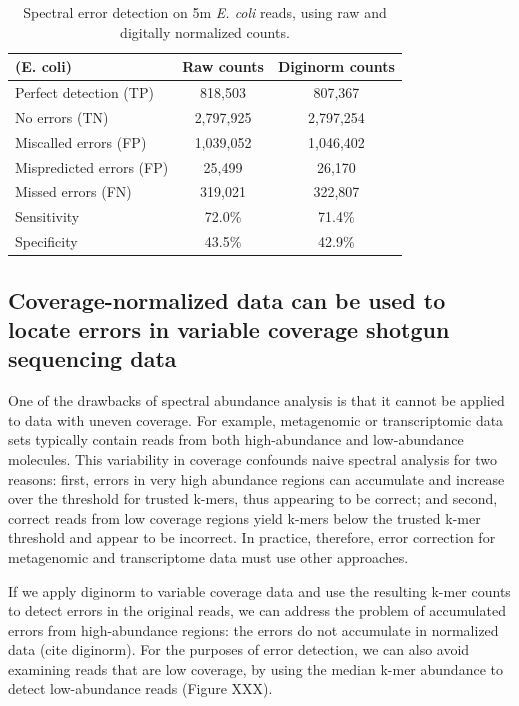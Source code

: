 \documentclass{article}
\begin{document}
\begin{table}
\begin{tabular}{|l|c|c|}
\hline
(E. coli) & Raw counts & Diginorm counts \\
\hline
Perfect detection (TP) & 818,503 & 807,367 \\
No errors (TN) & 2,797,925 & 2,797,254 \\
Miscalled errors (FP) & 1,039,052 & 1,046,402 \\
Mispredicted errors (FP) & 25,499 & 26,170 \\
Missed errors (FN) & 319,021 & 322,807 \\
\hline
Sensitivity & 72.0\% & 71.4\% \\
Specificity & 43.5\% & 42.9\% \\
\hline
\end{tabular}
\label{tab:ecoli_dn_counts}

\caption{Spectral error detection on 5m {\em E. coli} reads, using raw and
  digitally normalized counts.}
\end{table}

\subsection{Coverage-normalized data can be used to locate errors in variable
coverage shotgun sequencing data}

One of the drawbacks of spectral abundance analysis is that it cannot
be applied to data with uneven coverage.  For example, metagenomic or
transcriptomic data sets typically contain reads from both
high-abundance and low-abundance molecules.  This variability in
coverage confounds naive spectral analysis for two reasons: first,
errors in very high abundance regions can accumulate and increase over
the threshold for trusted k-mers, thus appearing to be correct; and
second, correct reads from low coverage regions yield k-mers below the
trusted k-mer threshold and appear to be incorrect.  In practice,
therefore, error correction for metagenomic and transcriptome data
must use other approaches.

If we apply diginorm to variable coverage data and use the resulting
k-mer counts to detect errors in the original reads, we can address
the problem of accumulated errors from high-abundance regions: the
errors do not accumulate in normalized data (cite diginorm).  For the
purposes of error detection, we can also avoid examining reads that
are low coverage, by using the median k-mer abundance to detect
low-abundance reads (Figure XXX).
\end{document}
